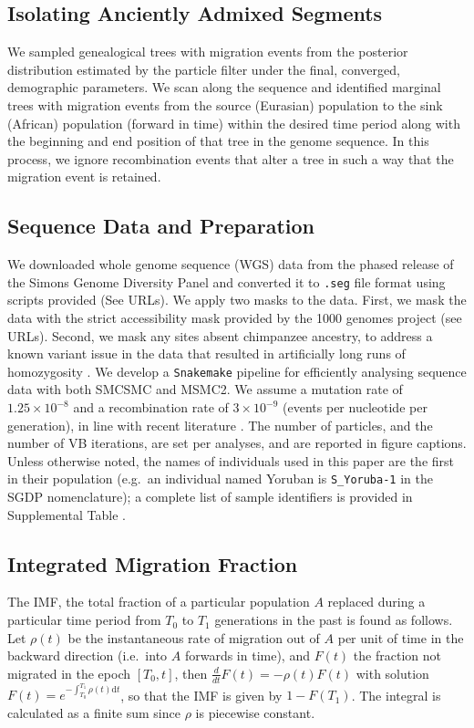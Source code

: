 \subsection{Isolating Anciently Admixed Segments} We sampled genealogical trees with migration events from the posterior distribution estimated by the particle filter under the final, converged, demographic parameters. We scan along the sequence and identified marginal trees with migration events from the source (Eurasian) population to the sink (African) population (forward in time) within the desired time period along with the beginning and end position of that tree in the genome sequence. In this process, we ignore recombination events that alter a tree in such a way that the migration event is retained.  

\subsection{Sequence Data and Preparation}  We downloaded whole genome sequence (WGS) data from the phased release of the Simons Genome Diversity Panel and converted it to {\tt .seg} file format using scripts provided (See URLs). We apply two masks to the data. First, we mask the data with the strict accessibility mask provided by the 1000 genomes project (see URLs). Second, we mask any sites absent chimpanzee ancestry, to address a known variant issue in the data that resulted in artificially long runs of homozygosity \cite{Wang2019a}. We develop a {\tt Snakemake} \cite{Koster2012} pipeline for efficiently analysing sequence data with both SMCSMC and MSMC2. We assume a mutation rate of $1.25\times10^{-8}$ and a recombination rate of $3\times10^{-9}$ (events per nucleotide per generation), in line with recent literature \cite{Scally2012, Schiffels2014a}. The number of particles, and the number of VB iterations, are set per analyses, and are reported in figure captions. Unless otherwise noted, the names of individuals used in this paper are the first in their population (e.g.\ an individual named Yoruban is {\tt S\_Yoruba-1} in the SGDP nomenclature); a complete list of sample identifiers is provided in Supplemental Table . 



\subsection{Integrated Migration Fraction}
The IMF, the total fraction of a particular population $A$ replaced during a particular time period from $T_0$ to $T_1$ generations in the past is found as follows. Let $\rho(t)$ be the instantaneous rate of migration out of $A$ per unit of time in the backward direction (i.e.\ into $A$ forwards in time), and $F(t)$ the fraction not migrated in the epoch $[T_0,t]$, then $\frac{d}{dt} F(t) = -\rho(t) F(t)$ with solution $F(t) = e^{- \int_{T_0}^{T_1} \rho(t) {\mathrm{d}t}}$, so that the IMF is given by $1-F(T_1)$.  The integral is calculated as a finite sum since $\rho$ is piecewise constant.




